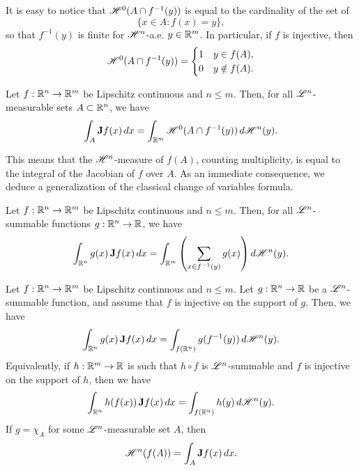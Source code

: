 \begin{remark}
It is easy to notice that $\mathscr{H}^{0}(A \cap f^{-1}(y))$ is equal to the cardinality of the set of $$\{ x \in A : f(x) = y \},$$
so that $f^{-1}(y)$ is finite for $\mathscr{H}^{n}$-a.e. $y \in \mathbb{R}^{m}$.
In particular, if $f$ is injective, then
\begin{equation*}
\mathscr{H}^{0}(A \cap f^{-1}(y)) = \begin{cases} 1 & y \in f(A), \\
0 & y \notin f(A).
\end{cases}
\end{equation*}
\end{remark}

\begin{theorem} \label{area_formula}
Let $f : \mathbb{R}^{n} \to \mathbb{R}^{m}$ be Lipschitz continuous and $n \le m$. Then, for all $\mathscr{L}^{n}$-measurable sets $A \subset \mathbb{R}^{n}$, we have
\begin{equation} \label{eq:area_formula}
\int_{A} {\bf J} f(x) \, dx = \int_{\mathbb{R}^{m}} \mathscr{H}^{0}(A \cap f^{-1}(y)) \, d\mathscr{H}^{n}(y).
\end{equation}
\end{theorem}

This means that the $\mathscr{H}^{n}$-measure of $f(A)$, counting multiplicity, is equal to the integral of the Jacobian of $f$ over $A$. As an immediate consequence, we deduce a generalization of the classical change of variables formula.

\begin{theorem} \label{change_variables_gen}
Let $f : \mathbb{R}^{n} \to \mathbb{R}^{m}$ be Lipschitz continuous and $n \le m$. Then, for all $\mathscr{L}^{n}$-summable functions $g : \mathbb{R}^{n} \to \mathbb{R}$, we have
\begin{equation} \label{eq:change_variables_gen}
\int_{\mathbb{R}^{n}} g(x) \, {\bf J} f(x) \, dx = \int_{\mathbb{R}^{m}} \left (\sum_{x \in f^{-1}(y)} g(x) \right ) d \mathscr{H}^{n}(y).
\end{equation}
\end{theorem}

\begin{corollary} \label{change_variables}
Let $f : \mathbb{R}^{n} \to \mathbb{R}^{m}$ be Lipschitz continuous and $n \le m$. Let $g : \mathbb{R}^{n} \to \mathbb{R}$ be a $\mathscr{L}^{n}$-summable function, and assume that $f$ is injective on the support of $g$. Then, we have
\begin{equation} \label{eq:change_variables_1}
\int_{\mathbb{R}^{n}} g(x) \, {\bf J} f(x) \, dx = \int_{f(\mathbb{R}^{n})} g(f^{-1}(y)) \, d \mathscr{H}^{n}(y).
\end{equation}
Equivalently, if $h : \mathbb{R}^{m} \to \mathbb{R}$ is such that $h \circ f$ is $\mathscr{L}^{n}$-summable and $f$ is injective on the support of $h$, then we have
\begin{equation} \label{eq:change_variables_2}
\int_{\mathbb{R}^{n}} h(f(x)) \, {\bf J} f(x) \, dx = \int_{f(\mathbb{R}^{n})} h(y) \, d \mathscr{H}^{n}(y).
\end{equation}
If $g = \chi_{A}$ for some $\mathscr{L}^{n}$-measurable set $A$, then
\begin{equation} \label{eq:area_formula_inj}
\mathscr{H}^{n}(f(A)) = \int_{A} {\bf J} f(x) \, dx.
\end{equation}
\end{corollary}

